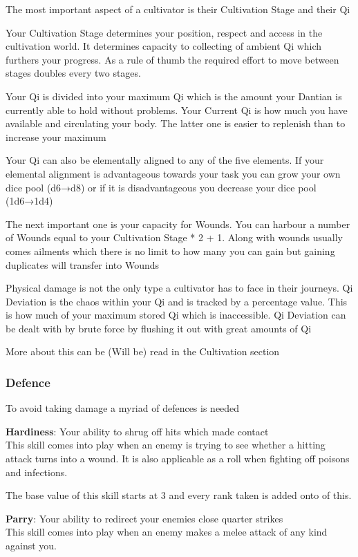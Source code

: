 The most important aspect of a cultivator is their Cultivation Stage and their Qi

Your Cultivation Stage determines your position, respect and access in the cultivation world. It determines capacity to collecting of ambient Qi which furthers your progress. 
As a rule of thumb the required effort to move between stages doubles every two stages.

Your Qi is divided into your maximum Qi which is the amount your Dantian is currently able to hold without problems. Your Current Qi is how much you have available and circulating your body. The latter one is easier to replenish than to increase your maximum

Your Qi can also be elementally aligned to any of the five elements. If your elemental alignment is advantageous towards your task you can grow your own dice pool (d6→d8) or if it is disadvantageous you decrease your dice pool (1d6→1d4)

The next important one is your capacity for Wounds. You can harbour a number of Wounds equal to your Cultivation Stage * 2 + 1. Along with wounds usually comes ailments which there is no limit to how many you can gain but gaining duplicates will transfer into Wounds

Physical damage is not the only type a cultivator has to face in their journeys. Qi Deviation is the chaos within your Qi and is tracked by a percentage value. This is how much of your maximum stored Qi which is inaccessible. Qi Deviation can be dealt with by brute force by flushing it out with great amounts of Qi

More about this can be (Will be) read in the Cultivation section

\subsubsection{Defence}

To avoid taking damage a myriad of defences is needed


\textbf{Hardiness}: Your ability to shrug off hits which made contact\\
This skill comes into play when an enemy is trying to see whether a hitting attack turns into a wound. It is also applicable as a roll when fighting off poisons and infections.

The base value of this skill starts at 3 and every rank taken is added onto of this.

\textbf{Parry}: Your ability to redirect your enemies close quarter strikes\\
This skill comes into play when an enemy makes a melee attack of any kind against you. 

